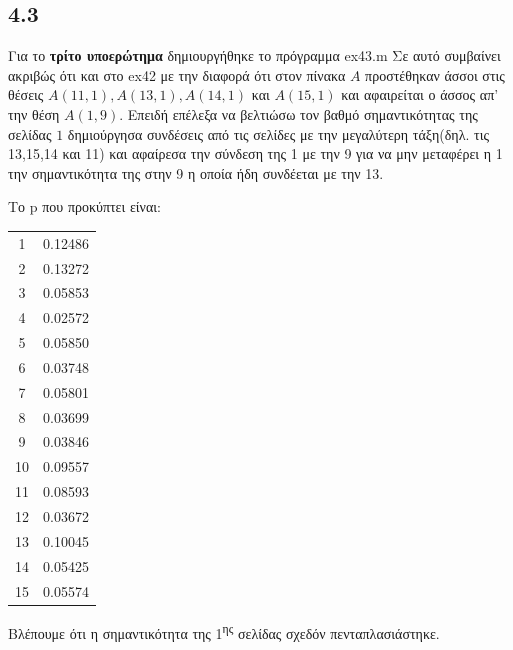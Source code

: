 \documentclass[a4paper,11pt]{article}
\begin{document}
\begin{flushleft}
\subsection*{4.3}
Για το \textbf{τρίτο υποερώτημα} δημιουργήθηκε το πρόγραμμα ex43.m Σε αυτό συμβαίνει ακριβώς ότι και στο ex42 με την διαφορά ότι στον πίνακα $A$ προστέθηκαν άσσοι στις θέσεις $A(11,1), A(13,1), A(14,1)$ και $A(15,1)$ και αφαιρείται ο άσσος απ' την θέση $A(1,9)$.\newline
Επειδή επέλεξα να βελτιώσω τον βαθμό σημαντικότητας της σελίδας $1$ δημιούργησα συνδέσεις από τις σελίδες με την μεγαλύτερη τάξη(δηλ. τις 13,15,14 και 11) και αφαίρεσα την σύνδεση της 1 με την 9 για να μην μεταφέρει η 1 την σημαντικότητα της στην 9 η οποία ήδη συνδέεται με την 13.\newpage

Το p που προκύπτει είναι:
\begin{center}
    \begin{tabular}{|c|c|}
        \hline
        1 & 0.12486 \\
        2 & 0.13272 \\
        3 & 0.05853 \\
        4 & 0.02572 \\
        5 & 0.05850 \\
        6 & 0.03748 \\
        7 & 0.05801 \\
        8 & 0.03699 \\
        9 & 0.03846 \\
        10 & 0.09557 \\
        11 & 0.08593 \\
        12 & 0.03672 \\
        13 & 0.10045 \\
        14 & 0.05425 \\
        15 & 0.05574 \\
        \hline
    \end{tabular}
\end{center}
Βλέπουμε ότι η σημαντικότητα της 1\textsuperscript{ης} σελίδας σχεδόν πενταπλασιάστηκε.


\end{flushleft}
\end{document}
